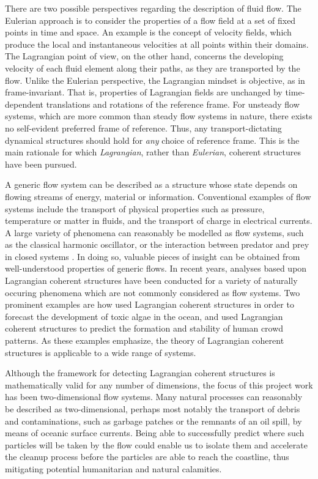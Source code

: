 There are two possible perspectives regarding the description of fluid flow.
The Eulerian approach is to consider the properties of a flow field at a set of
fixed points in time and space. An example is the concept of velocity fields,
which produce the local and instantaneous velocities at all points within their
domains. The Lagrangian point of view, on the other hand, concerns the
developing velocity of each fluid element along their paths, as they are
transported by the flow. Unlike the Eulerian perspective, the Lagrangian
mindset is objective, as in frame-invariant. That is, properties of Lagrangian
fields are unchanged by time-dependent translations and rotations of the
reference frame. For unsteady flow systems, which are more common than steady
flow systems in nature, there exists no self-evident preferred frame of
reference. Thus, any transport-dictating dynamical structures should
hold for \emph{any} choice of reference frame. This is the main
rationale for which \emph{Lagrangian}, rather than \emph{Eulerian}, coherent
structures have been pursued.

A generic flow system can be described as a structure whose state depends on
flowing streams of energy, material or information. Conventional examples of
flow systems include the transport of physical properties such as pressure,
temperature or matter in fluids, and the transport of charge in electrical
currents. A large variety of phenomena can reasonably be modelled as flow
systems, such as the classical harmonic oscillator, or the interaction between
predator and prey in closed systems
\parencite[parts I--II]{strogatz2014nonlinear}. In doing so, valuable pieces
of insight can be obtained from well-understood properties of generic flows.
In recent years, analyses based upon Lagrangian coherent structures have been
conducted for a variety of naturally occuring phenomena which are not
commonly considered as flow systems. Two prominent examples are how
\textcite{olascoaga2008tracing} used Lagrangian coherent structures in order
to forecast the development of toxic algae in the ocean, and
\textcite{ali2007lagrangian} used Lagrangian coherent structures to predict
the formation and stability of human crowd patterns. As these examples
emphasize, the theory of Lagrangian coherent structures is applicable to a
wide range of systems.

Although the framework for detecting Lagrangian coherent structures is
mathematically valid for any number of dimensions, the focus of this project
work has been two-dimensional flow systems. Many natural processes can
reasonably be described as two-dimensional, perhaps most notably the transport
of debris and contaminations, such as garbage patches or the remnants of
an oil spill, by means of oceanic surface currents. Being able to successfully
predict where such particles will be taken by the flow could enable us to
isolate them and accelerate the cleanup process before the particles are able
to reach the coastline, thus mitigating potential humanitarian and natural
calamities.

